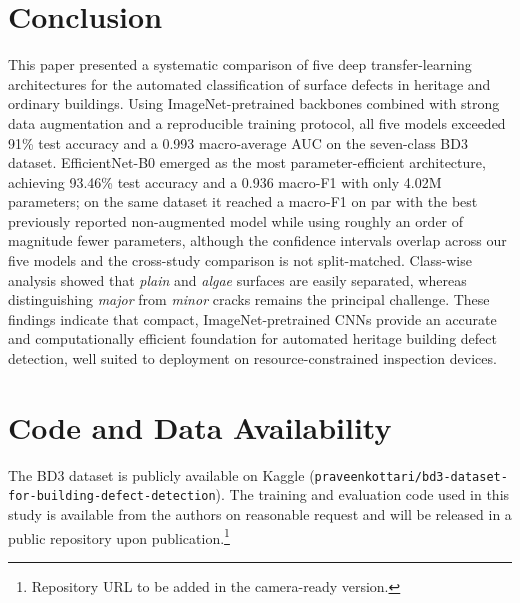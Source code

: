 \documentclass[conference]{IEEEtran}
\begin{document}
\section{Conclusion}
This paper presented a systematic comparison of five deep transfer-learning architectures for the automated classification of surface defects in heritage and ordinary buildings. Using ImageNet-pretrained backbones combined with strong data augmentation and a reproducible training protocol, all five models exceeded 91\% test accuracy and a 0.993 macro-average AUC on the seven-class BD3 dataset. EfficientNet-B0 emerged as the most parameter-efficient architecture, achieving 93.46\% test accuracy and a 0.936 macro-F1 with only 4.02M parameters; on the same dataset it reached a macro-F1 on par with the best previously reported non-augmented model while using roughly an order of magnitude fewer parameters, although the confidence intervals overlap across our five models and the cross-study comparison is not split-matched. Class-wise analysis showed that \textit{plain} and \textit{algae} surfaces are easily separated, whereas distinguishing \textit{major} from \textit{minor} cracks remains the principal challenge. These findings indicate that compact, ImageNet-pretrained CNNs provide an accurate and computationally efficient foundation for automated heritage building defect detection, well suited to deployment on resource-constrained inspection devices.

\section*{Code and Data Availability}
The BD3 dataset is publicly available on Kaggle (\texttt{praveenkottari/bd3-dataset-\allowbreak for-building-defect-detection}). The training and evaluation code used in this study is available from the authors on reasonable request and will be released in a public repository upon publication.\footnote{Repository URL to be added in the camera-ready version.}
\end{document}
